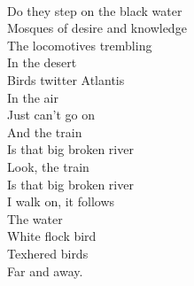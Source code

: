\documentclass[smalldemyvopaper,11pt,twoside,onecolumn,openright,extrafontsizes]{memoir}
\begin{document}
\\Do they step on the black water
\\Mosques of desire and knowledge
\\The locomotives trembling
\\In the desert
\\Birds twitter Atlantis
\\In the air
\\Just can't go on
\\And the train
\\Is that big broken river
\\Look, the train
\\Is that big broken river
\\I walk on, it follows
\\The water
\\White flock bird
\\Texhered birds
\\Far and away.
\end{document}
